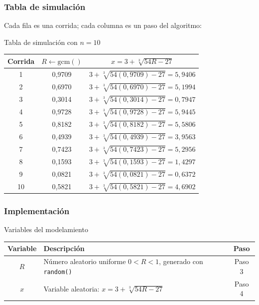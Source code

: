\subsubsection{Tabla de simulación}

Cada fila es una corrida; cada columna es un paso del algoritmo:

\begin{mitabla}[H]{Tabla de simulación con $n=10$}
\begin{tabular}{c cc}
\toprule
Corrida & $R \leftarrow \text{gcm}()$ & $x = 3+\sqrt[3]{54R-27}$ \\
\midrule
1  & 0,9709 & $3+\sqrt[3]{54(0{,}9709)-27} = 5{,}9406$ \\
2  & 0,6970 & $3+\sqrt[3]{54(0{,}6970)-27} = 5{,}1994$ \\
3  & 0,3014 & $3+\sqrt[3]{54(0{,}3014)-27} = 0{,}7947$ \\
4  & 0,9728 & $3+\sqrt[3]{54(0{,}9728)-27} = 5{,}9445$ \\
5  & 0,8182 & $3+\sqrt[3]{54(0{,}8182)-27} = 5{,}5806$ \\
6  & 0,4939 & $3+\sqrt[3]{54(0{,}4939)-27} = 3{,}9563$ \\
7  & 0,7423 & $3+\sqrt[3]{54(0{,}7423)-27} = 5{,}2956$ \\
8  & 0,1593 & $3+\sqrt[3]{54(0{,}1593)-27} = 1{,}4297$ \\
9  & 0,0821 & $3+\sqrt[3]{54(0{,}0821)-27} = 0{,}6372$ \\
10 & 0,5821 & $3+\sqrt[3]{54(0{,}5821)-27} = 4{,}6902$ \\
\bottomrule
\end{tabular}
\end{mitabla}

\subsubsection{Implementación}

\begin{mitabla}[H]{Variables del modelamiento}
\begin{tabular}{cL{8cm}c}
\toprule
Variable & Descripción & Paso \\
\midrule
$R$ & Número aleatorio uniforme $0 < R < 1$, generado con \texttt{random()} & Paso 3 \\
$x$ & Variable aleatoria: $x = 3 + \sqrt[3]{54R - 27}$ & Paso 4 \\
\bottomrule
\end{tabular}
\end{mitabla}

